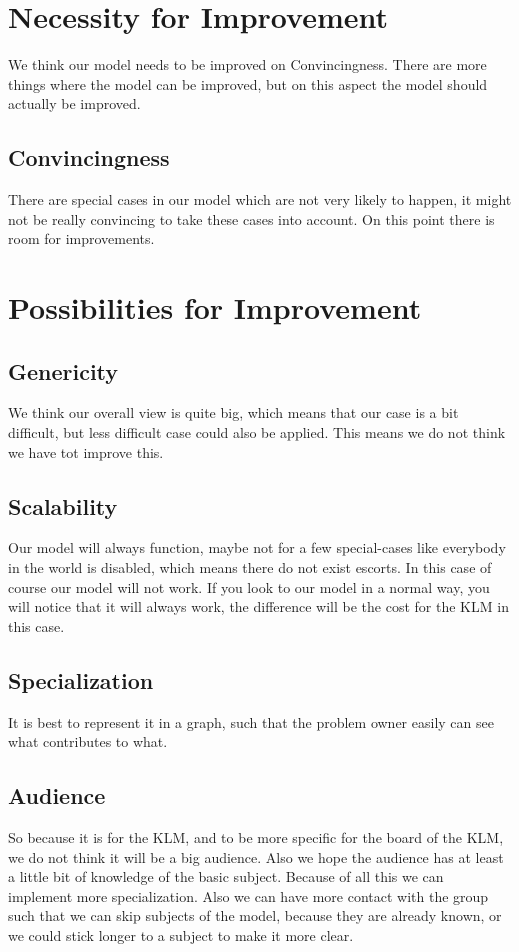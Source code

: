 \documentclass[a4paper, 11pt, notitlepage]{report}
\begin{document}
\chapter{Necessity for Improvement}
We think our model needs to be improved on Convincingness. There are more things where the model can be improved, but on this aspect the model should actually be improved.
\section{Convincingness}
There are special cases in our model which are not very likely to happen, it might not be really convincing to take these cases into account. On this point there is room for improvements.
\chapter{Possibilities for Improvement}
\section{Genericity}
    We think our overall view is quite big, which means that our case is a bit difficult, but less difficult case could also be applied. This means we do not think we have tot improve this.
\section{Scalability}
    Our model will always function, maybe not for a few special-cases like everybody in the world is disabled, which means there do not exist escorts. In this case of course our model will not work. If you look to our model in a normal way, you will notice that it will always work, the difference will be the cost for the KLM in this case.
\section{Specialization}
    It is best to represent it in a graph, such that the problem owner easily can see what contributes to what.
\section{Audience}
    So because it is for the KLM, and to be more specific for the board of the KLM, we do not think it will be a big audience. Also we hope the audience has at least a little bit of knowledge of the basic subject. Because of all this we can implement more specialization. Also we can have more contact with the group such that we can skip subjects of the model, because they are already known, or we could stick longer to a subject to make it more clear.
\end{document}
